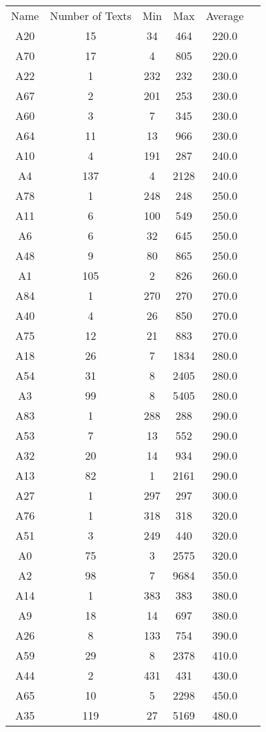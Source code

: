 \newpage
\begin{tabular}{cccccc}
Name & Number of Texts & Min & Max & Average\\
A20 & 15 & 34 & 464 & 220.0\\
A70 & 17 & 4 & 805 & 220.0\\
A22 & 1 & 232 & 232 & 230.0\\
A67 & 2 & 201 & 253 & 230.0\\
A60 & 3 & 7 & 345 & 230.0\\
A64 & 11 & 13 & 966 & 230.0\\
A10 & 4 & 191 & 287 & 240.0\\
A4 & 137 & 4 & 2128 & 240.0\\
A78 & 1 & 248 & 248 & 250.0\\
A11 & 6 & 100 & 549 & 250.0\\
A6 & 6 & 32 & 645 & 250.0\\
A48 & 9 & 80 & 865 & 250.0\\
A1 & 105 & 2 & 826 & 260.0\\
A84 & 1 & 270 & 270 & 270.0\\
A40 & 4 & 26 & 850 & 270.0\\
A75 & 12 & 21 & 883 & 270.0\\
A18 & 26 & 7 & 1834 & 280.0\\
A54 & 31 & 8 & 2405 & 280.0\\
A3 & 99 & 8 & 5405 & 280.0\\
A83 & 1 & 288 & 288 & 290.0\\
A53 & 7 & 13 & 552 & 290.0\\
A32 & 20 & 14 & 934 & 290.0\\
A13 & 82 & 1 & 2161 & 290.0\\
A27 & 1 & 297 & 297 & 300.0\\
A76 & 1 & 318 & 318 & 320.0\\
A51 & 3 & 249 & 440 & 320.0\\
A0 & 75 & 3 & 2575 & 320.0\\
A2 & 98 & 7 & 9684 & 350.0\\
A14 & 1 & 383 & 383 & 380.0\\
A9 & 18 & 14 & 697 & 380.0\\
A26 & 8 & 133 & 754 & 390.0\\
A59 & 29 & 8 & 2378 & 410.0\\
A44 & 2 & 431 & 431 & 430.0\\
A65 & 10 & 5 & 2298 & 450.0\\
A35 & 119 & 27 & 5169 & 480.0\\
\end{tabular}
